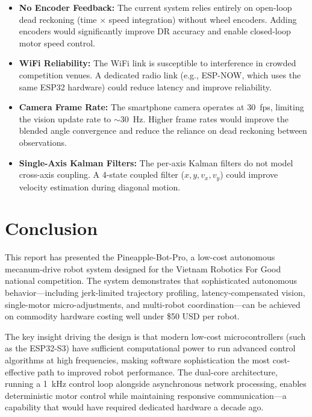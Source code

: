 \documentclass[12pt, a4paper, twoside]{article}
\begin{document}
\begin{itemize}
    \item \textbf{No Encoder Feedback:} The current system relies entirely on open-loop dead reckoning (time $\times$ speed integration) without wheel encoders. Adding encoders would significantly improve DR accuracy and enable closed-loop motor speed control.

    \item \textbf{WiFi Reliability:} The WiFi link is susceptible to interference in crowded competition venues. A dedicated radio link (e.g., ESP-NOW, which uses the same ESP32 hardware) could reduce latency and improve reliability.

    \item \textbf{Camera Frame Rate:} The smartphone camera operates at \SI{30}{fps}, limiting the vision update rate to {$\sim$\SI{30}{\hertz}}. Higher frame rates would improve the blended angle convergence and reduce the reliance on dead reckoning between observations.

    \item \textbf{Single-Axis Kalman Filters:} The per-axis Kalman filters do not model cross-axis coupling. A 4-state coupled filter ($x, y, v_x, v_y$) could improve velocity estimation during diagonal motion.
\end{itemize}

\section{Conclusion}
\label{sec:conclusion}

This report has presented the Pineapple-Bot-Pro, a low-cost autonomous mecanum-drive robot system designed for the Vietnam Robotics For Good national competition. The system demonstrates that sophisticated autonomous behavior---including jerk-limited trajectory profiling, latency-compensated vision, single-motor micro-adjustments, and multi-robot coordination---can be achieved on commodity hardware costing well under \$50 USD per robot.

The key insight driving the design is that modern low-cost microcontrollers (such as the ESP32-S3) have sufficient computational power to run advanced control algorithms at high frequencies, making software sophistication the most cost-effective path to improved robot performance. The dual-core architecture, running a \SI{1}{\kilo\hertz} control loop alongside asynchronous network processing, enables deterministic motor control while maintaining responsive communication---a capability that would have required dedicated hardware a decade ago.
\end{document}
